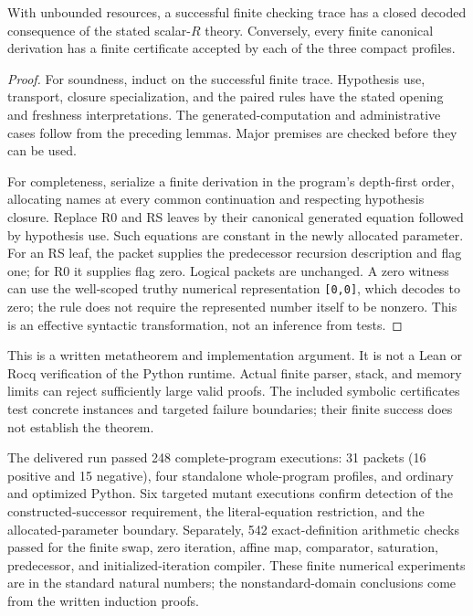 \begin{theorem}
With unbounded resources, a successful finite checking trace has a
closed decoded consequence of the stated scalar-$R$ theory. Conversely,
every finite canonical derivation has a finite certificate accepted by
each of the three compact profiles.
\end{theorem}
\begin{proof}
For soundness, induct on the successful finite trace. Hypothesis use,
transport, closure specialization, and the paired rules have the stated
opening and freshness interpretations. The generated-computation and
administrative cases follow from the preceding lemmas. Major premises
are checked before they can be used.

For completeness, serialize a finite derivation in the program's
depth-first order, allocating names at every common continuation and
respecting hypothesis closure. Replace R0 and RS leaves by their
canonical generated equation followed by hypothesis use. Such equations
are constant in the newly allocated parameter. For an RS leaf, the
packet supplies the predecessor recursion description and flag one;
for R0 it supplies flag zero. Logical packets are unchanged. A zero
witness can use the well-scoped truthy numerical representation
\texttt{[0,0]}, which decodes to zero; the rule does not require
the represented number itself to be nonzero. This is
an effective syntactic transformation, not an inference from tests.
\end{proof}

This is a written metatheorem and implementation argument. It is not a
Lean or Rocq verification of the Python runtime. Actual finite parser,
stack, and memory limits can reject sufficiently large valid proofs.
The included symbolic certificates test concrete instances and targeted
failure boundaries; their finite success does not establish the theorem.

The delivered run passed 248 complete-program executions: 31 packets
(16 positive and 15 negative), four standalone whole-program profiles,
and ordinary and optimized Python. Six targeted mutant executions
confirm detection of the constructed-successor requirement, the
literal-equation restriction, and the allocated-parameter boundary.
Separately, 542 exact-definition arithmetic checks passed for the finite
swap, zero iteration, affine map, comparator, saturation, predecessor,
and initialized-iteration compiler. These finite numerical experiments
are in the standard natural numbers; the nonstandard-domain conclusions
come from the written induction proofs.

